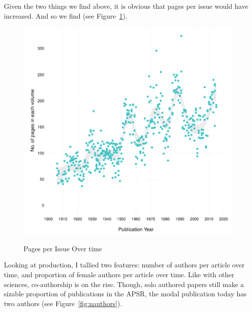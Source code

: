 \documentclass[11pt]{article}
\begin{document}
Given the two things we find above, it is obvious that pages per issue would have increased. And so we find (see Figure~\ref{fig:issue}). 

\begin{figure}[htbp]
\centering
\caption{Pages per Issue Over time}
\includegraphics[scale=.85]{../figs/pages_per_issue_over_time.pdf}
\label{fig:issue}
\end{figure}

Looking at production, I tallied two features: number of authors per article over time, and proportion of female authors per article over time. Like with other sciences, co-authorship is on the rise. Though, solo authored papers still make a sizable proportion of publications in the APSR, the modal publication today has two authors (see Figure~\ref{fig:nauthors}).
\end{document}
